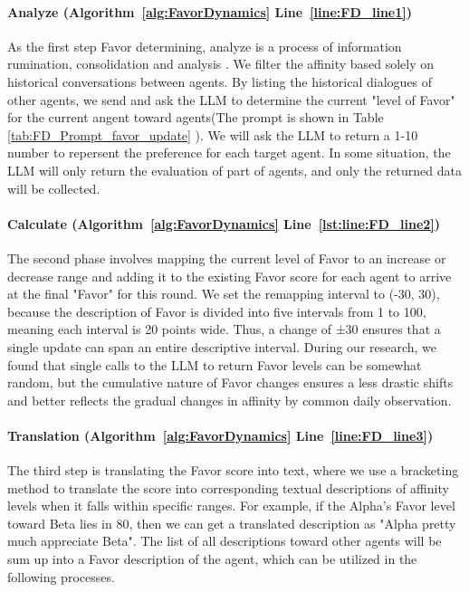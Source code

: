 \paragraph{Analyze (Algorithm~\ref{alg:FavorDynamics} Line~\ref{line:FD_line1})} As the first step Favor determining, analyze is a process of information rumination, consolidation and analysis . We filter the affinity based solely on historical conversations between agents. By listing the historical dialogues of other agents, we send and ask the LLM to determine the current "level of Favor" for the current angent toward agents(The prompt is shown in Table \ref{tab:FD_Prompt_favor_update} ). We will ask the LLM to return a 1-10 number to repersent the preference for each target agent. In some situation, the LLM will only return the evaluation of part of agents, and only the returned data will be collected.

\paragraph{Calculate (Algorithm~\ref{alg:FavorDynamics} Line~\ref{lst:line:FD_line2})} The second phase involves mapping the current level of Favor to an increase or decrease range and adding it to the existing Favor score for each agent to arrive at the final "Favor" for this round. We set the remapping interval to (-30, 30), because the description of Favor is divided into five intervals from 1 to 100, meaning each interval is 20 points wide. Thus, a change of ±30 ensures that a single update can span an entire descriptive interval. During our research, we found that single calls to the LLM to return Favor levels can be somewhat random, but the cumulative nature of Favor changes ensures a less drastic shifts and better reflects the gradual changes in affinity by common daily observation. 

\paragraph{Translation (Algorithm~\ref{alg:FavorDynamics} Line~\ref{line:FD_line3})} The third step is translating the Favor score into text, where we use a bracketing method to translate the score into corresponding textual descriptions of affinity levels when it falls within specific ranges. For example, if the Alpha's Favor level toward Beta lies in 80, then we can get a translated description as "Alpha pretty much appreciate Beta". The list of all descriptions toward other agents will be sum up into a Favor description of the agent, which can be utilized in the following processes. 

